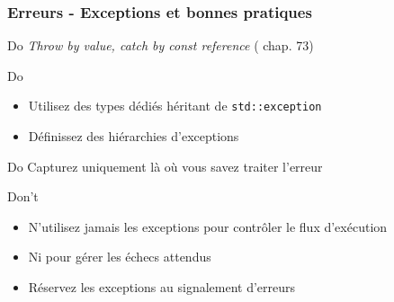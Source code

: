 \documentclass[C++.tex]{subfiles}
\begin{document}
\begin{frame}
	\frametitle{Erreurs - Exceptions et bonnes pratiques}
	\begin{exampleblock}{Do}
		\textit{Throw by value, catch by const reference} (\cite{coding} chap. 73)
	\end{exampleblock}

	\begin{exampleblock}{Do}
		\begin{itemize}
			\item Utilisez des types dédiés héritant de \lstinline|std::exception|


			\item Définissez des hiérarchies d'exceptions
		\end{itemize}
	\end{exampleblock}

	\begin{exampleblock}{Do}
		Capturez uniquement là où vous savez traiter l'erreur
	\end{exampleblock}

	\begin{alertblock}{Don't}
		\begin{itemize}
			\item N'utilisez jamais les exceptions pour contrôler le flux d'exécution
			\item Ni pour gérer les \og échecs attendus\fg{}


			\item Réservez les exceptions au signalement d'erreurs


		\end{itemize}
	\end{alertblock}
\end{frame}
\end{document}
